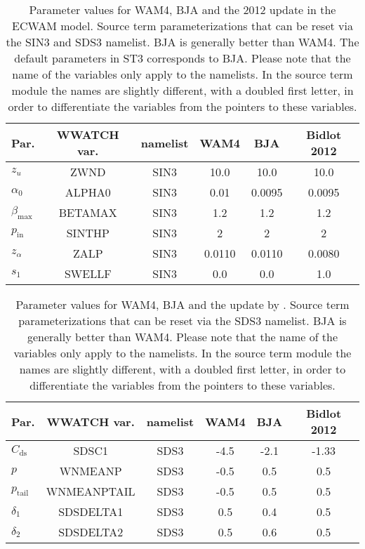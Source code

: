 \begin{table} \begin{center}
\begin{tabular}{|l|c|c|c|c|c|} \hline \hline
Par.         &  WWATCH var.           & namelist & WAM4 & BJA   & Bidlot 2012 \\
\hline
  $z_u$ &  ZWND                       & SIN3 & 10.0    & 10.0   & 10.0   \\
  $\alpha_0$ &  ALPHA0                & SIN3 & 0.01    & 0.0095 &  0.0095 \\
  $\beta_{\mathrm{max}}$ & BETAMAX    & SIN3 & 1.2     & 1.2    & 1.2  \\
  $p_{\mathrm{in}}$ &  SINTHP         & SIN3 & 2       & 2      & 2  \\
  $z_\alpha$ &  ZALP                  & SIN3 & 0.0110  & 0.0110 &  0.0080 \\
  $s_1$ &  SWELLF                     & SIN3 & 0.0     & 0.0    & 1.0   \\
\hline
\end{tabular} \end{center}
\caption{Parameter values for WAM4, BJA and the 2012 update in the ECWAM model. Source term
  parameterizations that can be reset via the SIN3 and SDS3 namelist. BJA is
  generally better than WAM4. The default parameters in ST3 corresponds to BJA. Please
  note that the name of the variables only apply to the namelists. In the source
  term module the names are slightly different, with a doubled first letter, in
  order to differentiate the variables from the pointers to these variables.} \label{tab:WAM4_parSIN}
\botline
\end{table}

\begin{table} \begin{center}
\begin{tabular}{|l|c|c|c|c|c|} \hline \hline
Par.                               &  WWATCH var.         & namelist & WAM4 & BJA   & Bidlot 2012 \\
\hline
  $C_{\mathrm{ds}}$                 &  SDSC1          & SDS3 & -4.5 & -2.1& -1.33       \\
  $p$                               &  WNMEANP        & SDS3 & -0.5 & 0.5 &  0.5        \\
  $p_{\mathrm{tail}}$               &  WNMEANPTAIL    & SDS3 & -0.5 & 0.5 &  0.5        \\
  $\delta_1$                        &  SDSDELTA1      & SDS3 & 0.5  & 0.4 &  0.5        \\
  $\delta_2$                        &  SDSDELTA2      & SDS3 & 0.5  & 0.6 &  0.5 \\
  \hline \hline
\end{tabular} \end{center}
\caption{Parameter values for WAM4, BJA and the update by \cite{pro:Bid12}. Source term
parameterizations that can be reset via the SDS3 namelist. BJA is generally
better than WAM4. Please note that the
name of the variables only apply to the namelists. In the source term module
the names are slightly different, with a doubled first letter, in order to
differentiate the variables from the pointers to these variables.} \label{tab:WAM4_parSDS}
\botline
\end{table}
